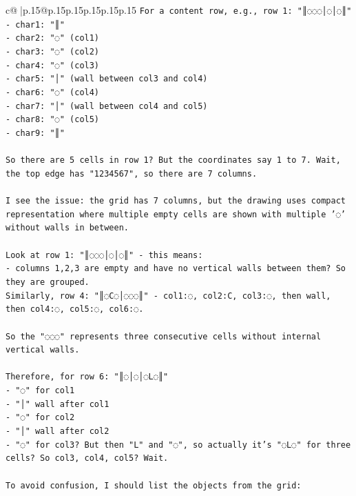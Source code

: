 \documentclass{article}
\begin{document}
{\begin{supertabular}{c@{$\;$}|p{.15\linewidth}@{}p{.15\linewidth}p{.15\linewidth}p{.15\linewidth}p{.15\linewidth}p{.15\linewidth}}
{{{\texttt{For a content row, e.g., row 1: "║◌◌◌│◌│◌║"} \\
\texttt{{-} char1: "║"} \\
\texttt{{-} char2: "◌" (col1)} \\
\texttt{{-} char3: "◌" (col2)} \\
\texttt{{-} char4: "◌" (col3)} \\
\texttt{{-} char5: "│" (wall between col3 and col4)} \\
\texttt{{-} char6: "◌" (col4)} \\
\texttt{{-} char7: "│" (wall between col4 and col5)} \\
\texttt{{-} char8: "◌" (col5)} \\
\texttt{{-} char9: "║"} \\
\\ 
\texttt{So there are 5 cells in row 1? But the coordinates say 1 to 7. Wait, the top edge has "1234567", so there are 7 columns.} \\
\\ 
\texttt{I see the issue: the grid has 7 columns, but the drawing uses compact representation where multiple empty cells are shown with multiple '◌' without walls in between.} \\
\\ 
\texttt{Look at row 1: "║◌◌◌│◌│◌║" {-} this means:} \\
\texttt{{-} columns 1,2,3 are empty and have no vertical walls between them? So they are grouped.} \\
\texttt{Similarly, row 4: "║◌C◌│◌◌◌║" {-} col1:◌, col2:C, col3:◌, then wall, then col4:◌, col5:◌, col6:◌.} \\
\\ 
\texttt{So the "◌◌◌" represents three consecutive cells without internal vertical walls.} \\
\\ 
\texttt{Therefore, for row 6: "║◌│◌│◌L◌║"} \\
\texttt{{-} "◌" for col1} \\
\texttt{{-} "│" wall after col1} \\
\texttt{{-} "◌" for col2} \\
\texttt{{-} "│" wall after col2} \\
\texttt{{-} "◌" for col3? But then "L" and "◌", so actually it's "◌L◌" for three cells? So col3, col4, col5? Wait.} \\
\\ 
\texttt{To avoid confusion, I should list the objects from the grid:} \\
}}}
\end{supertabular}}
\end{document}
